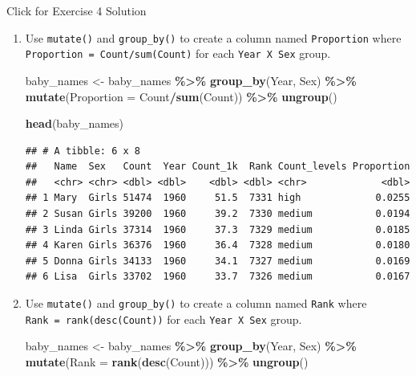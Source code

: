 \documentclass[
]{book}
\newenvironment{Shaded}{\begin{snugshade}}{\end{snugshade}}
\newcommand{\DataTypeTok}[1]{\textcolor[rgb]{0.13,0.29,0.53}{#1}}
\newcommand{\KeywordTok}[1]{\textcolor[rgb]{0.13,0.29,0.53}{\textbf{#1}}}
\newcommand{\NormalTok}[1]{#1}
\newcommand{\OperatorTok}[1]{\textcolor[rgb]{0.81,0.36,0.00}{\textbf{#1}}}
\newcommand{\StringTok}[1]{\textcolor[rgb]{0.31,0.60,0.02}{#1}}
\begin{document}
{Click for Exercise 4 Solution}

\begin{enumerate}
\def\labelenumi{\arabic{enumi}.}
\item
  Use \texttt{mutate()} and \texttt{group\_by()} to create a column named \texttt{Proportion} where \texttt{Proportion\ =\ Count/sum(Count)} for each \texttt{Year\ X\ Sex} group.

\begin{Shaded}
\begin{Highlighting}[]
\NormalTok{baby\_names \textless{}{-}}\StringTok{ }
\StringTok{  }\NormalTok{baby\_names }\OperatorTok{\%\textgreater{}\%}
\StringTok{  }\KeywordTok{group\_by}\NormalTok{(Year, Sex) }\OperatorTok{\%\textgreater{}\%}
\StringTok{  }\KeywordTok{mutate}\NormalTok{(}\DataTypeTok{Proportion =}\NormalTok{ Count}\OperatorTok{/}\KeywordTok{sum}\NormalTok{(Count)) }\OperatorTok{\%\textgreater{}\%}
\StringTok{  }\KeywordTok{ungroup}\NormalTok{()}

\KeywordTok{head}\NormalTok{(baby\_names) }
\end{Highlighting}
\end{Shaded}

\begin{verbatim}
## # A tibble: 6 x 8
##   Name  Sex   Count  Year Count_1k  Rank Count_levels Proportion
##   <chr> <chr> <dbl> <dbl>    <dbl> <dbl> <chr>             <dbl>
## 1 Mary  Girls 51474  1960     51.5  7331 high             0.0255
## 2 Susan Girls 39200  1960     39.2  7330 medium           0.0194
## 3 Linda Girls 37314  1960     37.3  7329 medium           0.0185
## 4 Karen Girls 36376  1960     36.4  7328 medium           0.0180
## 5 Donna Girls 34133  1960     34.1  7327 medium           0.0169
## 6 Lisa  Girls 33702  1960     33.7  7326 medium           0.0167
\end{verbatim}
\item
  Use \texttt{mutate()} and \texttt{group\_by()} to create a column named \texttt{Rank} where \texttt{Rank\ =\ rank(desc(Count))} for each \texttt{Year\ X\ Sex} group.

\begin{Shaded}
\begin{Highlighting}[]
\NormalTok{baby\_names \textless{}{-}}\StringTok{ }
\StringTok{  }\NormalTok{baby\_names }\OperatorTok{\%\textgreater{}\%}
\StringTok{  }\KeywordTok{group\_by}\NormalTok{(Year, Sex) }\OperatorTok{\%\textgreater{}\%}
\StringTok{  }\KeywordTok{mutate}\NormalTok{(}\DataTypeTok{Rank =} \KeywordTok{rank}\NormalTok{(}\KeywordTok{desc}\NormalTok{(Count))) }\OperatorTok{\%\textgreater{}\%}
\StringTok{  }\KeywordTok{ungroup}\NormalTok{()}


\end{Highlighting}
\end{Shaded}
\end{enumerate}
\end{document}
